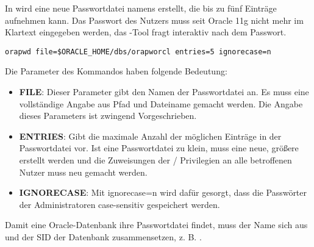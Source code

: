           In  wird eine neue Passwortdatei namens  erstellt, die bis zu fünf Einträge aufnehmen kann. Das Passwort des Nutzers  muss seit Oracle 11g nicht mehr im Klartext eingegeben werden, das -Tool fragt interaktiv nach dem Passwort.
          \begin{lstlisting}[caption={Erstellen einer Passwortdatei mit
          ORAPWD},label=admin210,language=terminal]
orapwd file=$ORACLE_HOME/dbs/orapworcl entries=5 ignorecase=n
          \end{lstlisting}
          Die Parameter des Kommandos  haben folgende Bedeutung:
          \begin{itemize}
            \item \textbf{FILE}: Dieser Parameter gibt den Namen der
            Passwortdatei an. Es muss eine voll\-stän\-dige Angabe aus Pfad
            und Dateiname gemacht werden. Die Angabe dieses Parameters ist
            zwingend Vorgeschrieben.
            \item \textbf{ENTRIES}: Gibt die maximale Anzahl der möglichen
            Einträge in der Passwortdatei vor. Ist eine            
            Passwortdatei zu klein, muss eine neue, größere erstellt werden
            und die Zuweisungen der /
            Privilegien an alle betroffenen Nutzer muss neu gemacht werden.
            \item \textbf{IGNORECASE}: Mit ignorecase=n wird dafür gesorgt, dass die Passwörter der Administratoren case-sensitiv gespeichert werden.
          \end{itemize}
          \begin{merke}
            Damit eine Oracle-Datenbank ihre Passwortdatei findet, muss der Name sich aus  und der SID der Datenbank zusammensetzen, z. B. .
          \end{merke}

